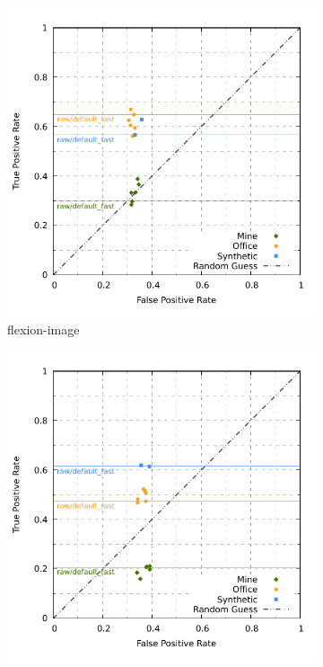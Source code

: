 \begin{figure}[htp]
\begin{subfigure}[t]{0.45\linewidth}
    \includegraphics[width=\linewidth]{chapter06/results/ORB/flexion/roc.pdf}%
    \caption{\gls{flexion-image}}
\end{subfigure}\quad
\begin{subfigure}[t]{0.45\linewidth}
    \includegraphics[width=\linewidth]{chapter06/results/ORB/bearing/roc.pdf}

\end{subfigure}
\end{figure}
